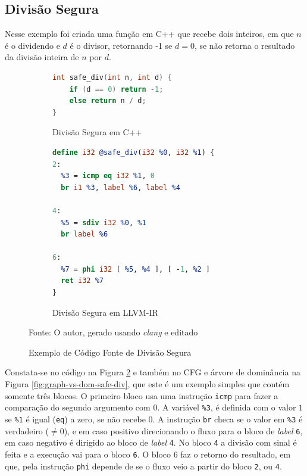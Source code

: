 \subsection{Divisão Segura}

Nesse exemplo foi criada uma função em C++ que recebe dois inteiros, em que $n$ é o dividendo e $d$ é o divisor, retornando -1 se $d = 0$, se não retorna o resultado da divisão inteira de $n$ por $d$.

\begin{figure}[ht]
    \centering
    \begin{subfigure}[b]{\textwidth}
        \centering
        \lstset{xleftmargin=.3\textwidth}
        \begin{lstlisting}[language=c,style=nasm]
int safe_div(int n, int d) {
    if (d == 0) return -1;
    else return n / d;
}
        \end{lstlisting}
        \caption{Divisão Segura em C++}
        \label{fig:image1}
    \end{subfigure}

    \vspace{1em} %

    \begin{subfigure}[b]{\textwidth}
        \begin{center}
        \lstset{xleftmargin=.24\textwidth}
        \begin{lstlisting}[language=llvm,style=nasm]
define i32 @safe_div(i32 %0, i32 %1) {
2:
  %3 = icmp eq i32 %1, 0
  br i1 %3, label %6, label %4

4:
  %5 = sdiv i32 %0, %1
  br label %6

6:
  %7 = phi i32 [ %5, %4 ], [ -1, %2 ]
  ret i32 %7
}
        \end{lstlisting}
        \caption{Divisão Segura em LLVM-IR}
        \label{fig:safe-div-llvm}
        \end{center}
    \end{subfigure}

    \vspace{.5em} %
    
    \caption{Exemplo de Código Fonte de Divisão Segura}
    \label{fig:safe-div}
    \small{Fonte: O autor, gerado usando \emph{clang} e editado}
\end{figure}

Constata-se no código na Figura \ref{fig:safe-div-llvm} e também no CFG e árvore de dominância na Figura \ref{fig:graph-vs-dom-safe-div}, que este é um exemplo simples que contém somente três blocos. O primeiro bloco usa uma instrução \verb|icmp| para fazer a comparação do segundo argumento com $0$. A variável \verb|%3|, é definida com o valor $1$ se \verb|%1| é igual (\verb|eq|) a zero, se não recebe $0$. A instrução \verb|br| checa se o valor em \verb|%3| é verdadeiro ($\neq 0$), e em caso positivo direcionando o fluxo para o bloco de \emph{label} \verb|6|, em caso negativo é dirigido ao bloco de \emph{label} \verb|4|. No bloco \verb|4| a divisão com sinal é feita e a execução vai para o bloco \verb|6|. O bloco 6 faz o retorno do resultado, em que, pela instrução \verb|phi| depende de se o fluxo veio a partir do bloco \verb|2|, ou \verb|4|.

